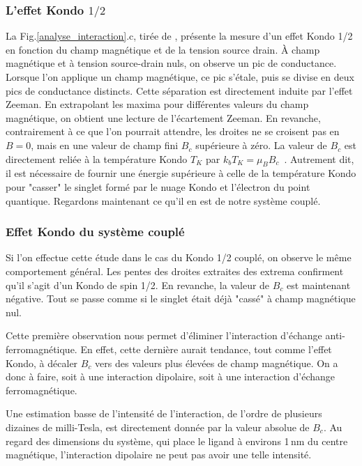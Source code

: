 \subsubsection{L'effet Kondo $1/2$}
La Fig.\ref{analyse_interaction}.c, tirée de \cite{Roch2009}, présente la mesure d'un effet Kondo 1/2 en fonction du champ magnétique et de la tension source drain. \`A champ magnétique et  à tension source-drain nuls, on observe un pic de conductance. Lorsque l'on applique un champ magnétique, ce pic s'étale, puis se divise en deux pics de conductance distincts. Cette séparation est directement induite par l'effet Zeeman. En extrapolant les maxima pour différentes valeurs du champ magnétique, on obtient une lecture de l'écartement Zeeman. En revanche, contrairement à ce que l'on pourrait attendre, les droites ne se croisent pas en $B=0$, mais en une valeur de champ fini $B_c$ supérieure à zéro. La valeur de $B_c$ est directement reliée à la température Kondo $T_K$ par $k_bT_K = \mu_B B_c$~\cite{Roch2009}. Autrement dit, il est nécessaire de fournir une énergie supérieure à celle de la température Kondo pour "casser" le singlet formé par le nuage Kondo et l'électron du point quantique. Regardons maintenant ce qu'il en est de notre système couplé.

\subsubsection{Effet Kondo du système couplé}
Si l'on effectue cette étude dans le cas du Kondo 1/2 couplé, on observe le même comportement général. Les pentes des droites extraites des extrema confirment qu'il s'agit d'un Kondo de spin 1/2. En revanche, la valeur de $B_c$ est maintenant négative. Tout se passe comme si le singlet était déjà "cassé" à champ magnétique nul. 

Cette première observation nous permet d'éliminer l'interaction d'échange anti-ferromagnétique. En effet, cette dernière aurait tendance, tout comme l'effet Kondo, à décaler $B_c$ vers des valeurs plus élevées de champ magnétique. On a donc à faire, soit à une interaction dipolaire, soit à une interaction d'échange ferromagnétique.

Une estimation basse de l'intensité de l'interaction, de l'ordre de plusieurs dizaines de milli-Tesla, est directement donnée par la valeur absolue de $B_c$. Au regard des dimensions du système, qui place le ligand à environs 1\,nm du centre magnétique, l'interaction dipolaire ne peut pas avoir une telle intensité. 

